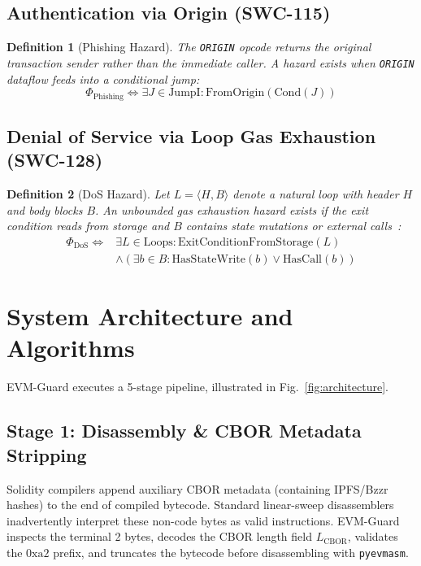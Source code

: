 \documentclass[conference]{IEEEtran}
\newtheorem{defn}{Definition}
\newenvironment{definition}[1][]{\begin{defn}[#1]\upshape}{\end{defn}}
\begin{document}
\subsection{Authentication via Origin (SWC-115)}
\begin{definition}[Phishing Hazard]
The \texttt{ORIGIN} opcode returns the original transaction sender rather than the immediate caller. A hazard exists when \texttt{ORIGIN} dataflow feeds into a conditional jump:
\begin{equation}
\Phi_{\mathrm{Phishing}} \iff \exists J \in \mathrm{JumpI} : \mathrm{FromOrigin}(\mathrm{Cond}(J))
\end{equation}
\end{definition}

\subsection{Denial of Service via Loop Gas Exhaustion (SWC-128)}
\begin{definition}[DoS Hazard]
Let $L = \langle H, B \rangle$ denote a natural loop with header $H$ and body blocks $B$. An unbounded gas exhaustion hazard exists if the exit condition reads from storage and $B$ contains state mutations or external calls~\cite{grech2018madmax, albert2020gasol}:
\begin{align}
\Phi_{\mathrm{DoS}} \iff &\exists L \in \mathrm{Loops} : \mathrm{ExitConditionFromStorage}(L) \nonumber \\
&\land (\exists b \in B : \mathrm{HasStateWrite}(b) \lor \mathrm{HasCall}(b))
\end{align}
\end{definition}

\section{System Architecture and Algorithms}\label{sec:architecture}

EVM-Guard executes a 5-stage pipeline, illustrated in Fig.~\ref{fig:architecture}.

\subsection{Stage 1: Disassembly \& CBOR Metadata Stripping}
Solidity compilers append auxiliary CBOR metadata (containing IPFS/Bzzr hashes) to the end of compiled bytecode. Standard linear-sweep disassemblers inadvertently interpret these non-code bytes as valid instructions. EVM-Guard inspects the terminal 2 bytes, decodes the CBOR length field $L_{\mathrm{CBOR}}$, validates the $0\mathrm{xa2}$ prefix, and truncates the bytecode before disassembling with \texttt{pyevmasm}.
\end{document}

